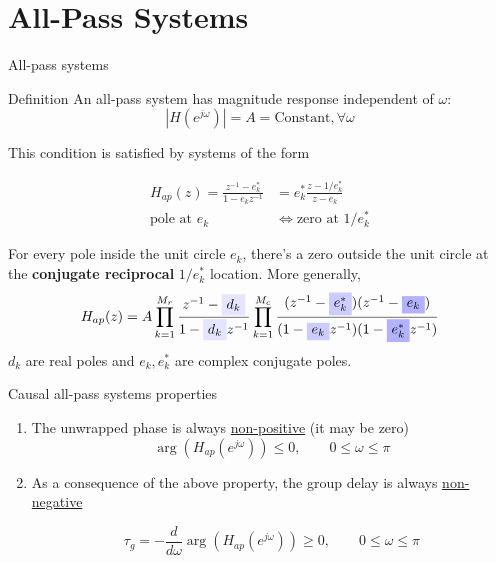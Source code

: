 \documentclass[10pt, aspectratio=169]{beamer}
\begin{document}
\section{All-Pass Systems}
\begin{frame}{All-pass systems}

\begin{block}{Definition}
	An all-pass system has magnitude response independent of $\omega$:
	\begin{equation*}
	|H(e^{j\omega})| = A = \text{Constant}, \forall \omega
	\end{equation*}
\end{block}

This condition is satisfied by systems of the form

\begin{align*}
H_{ap}(z) = \frac{z^{-1} - e_k^*}{1 - e_kz^{-1}} &= e_k^*\frac{z - 1/e_k^*}{z - e_k} \\
\text{pole at $e_k$} &\Longleftrightarrow \text{zero at $1/e_k^*$} 
\end{align*}

For every pole inside the unit circle $e_k$, there's a zero outside the unit circle at the \textbf{conjugate reciprocal} $1/e_k^*$ location. More generally,
\vspace{-0.25cm}
\begin{align*}
H_{ap}(z) = A\prod_{k = 1}^{M_r}\frac{z^{-1} - \tikz[baseline]{\node[fill=blue!10,anchor=base] {$d_k$};}}{1 - \tikz[baseline]{\node[fill=blue!10,anchor=base] {$d_k$};}z^{-1}}\prod_{k = 1}^{M_c}\frac{(z^{-1} - \tikz[baseline]{\node[fill=blue!20,anchor=base] {$e^*_k$};})(z^{-1} - \tikz[baseline]{\node[fill=blue!30,anchor=base] {$e_k$};})}{(1 - \tikz[baseline]{\node[fill=blue!20,anchor=base] {$e_k$};}z^{-1})(1 - \tikz[baseline]{\node[fill=blue!30,anchor=base] {$e^*_k$};}z^{-1})}
\end{align*}
$d_k$ are real poles and $e_k, e^*_k$ are complex conjugate poles.
\end{frame}

\begin{frame}{Causal all-pass systems properties}
\begin{enumerate}
	\item The unwrapped phase is always \underline{non-positive} (it may be zero)
	\begin{equation*}
	\arg(H_{ap}(e^{j\omega})) \leq 0, \qquad 0 \leq \omega\leq\pi
	\end{equation*}
	\item As a consequence of the above property, the group delay is always \underline{non-negative}
	
	\begin{equation*}
	\tau_g = -\dfrac{d}{d\omega}\arg(H_{ap}(e^{j\omega})) \geq 0, \qquad 0 \leq \omega\leq\pi
	\end{equation*} 
	
\end{enumerate}
\end{frame}
\end{document}
